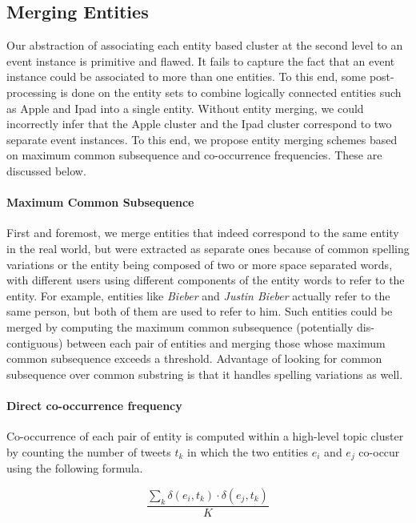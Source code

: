 \subsection{Merging Entities} \label{section:cooccurence}
Our abstraction of associating each entity based cluster at the second level to an event instance is primitive and flawed. It fails to capture the fact that an event instance could be associated to more than one entities. To this end, some post-processing is done on the entity sets to combine logically connected entities such as Apple and Ipad into a single entity. Without entity merging, we could incorrectly infer that the Apple cluster and the Ipad cluster correspond to two separate event instances. To this end, we propose entity merging schemes based on maximum common subsequence and co-occurrence frequencies. These are discussed below.

\paragraph{Maximum Common Subsequence}
First and foremost, we merge entities that indeed correspond to the same entity in the real world, but were extracted as separate ones because of common spelling variations or the entity being composed of two or more space separated words, with different users using different components of the entity words to refer to the entity. For example, entities like \textit{Bieber} and \textit{Justin Bieber} actually refer to the same person, but both of them are used to refer to him. Such entities could be merged by computing the maximum common subsequence (potentially dis-contiguous) between each pair of entities and merging those whose maximum common subsequence exceeds a threshold. Advantage of looking for common subsequence over common substring is that it handles spelling variations as well.

\paragraph{Direct co-occurrence frequency}
Co-occurrence of each pair of entity is computed within a high-level topic cluster by counting the number of tweets $t_k$ in which the two entities $e_i$ and $e_j$ co-occur using the following formula.

\begin{equation}
\frac{\sum_k\delta(e_i, t_k) \cdot \delta(e_j, t_k)}{K}
\end{equation}
	
